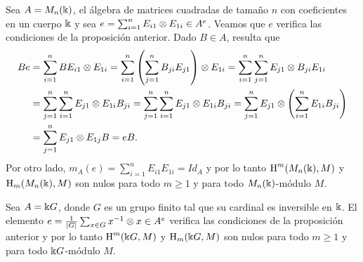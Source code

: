\documentclass[a4paper,oneside,fleqn,11pt,../tesis.tex]{subfiles}
\begin{document}
\begin{example}
	Sea $A = M_n(\Bbbk)$, el álgebra de matrices cuadradas de tamaño $n$ con coeficientes en un cuerpo $\Bbbk$ y 
	sea $e = \sum_{i = 1}^{n}E_{i1} \otimes E_{1i} \in A^e$. Veamos que $e$ verifica las condiciones de la proposición
	anterior. Dado $B \in A$, resulta que
	\begin{align*}
		Be &= \sum_{i = 1}^{n} B E_{i1} \otimes E_{1i} = \sum_{i = 1}^{n} \left(\sum_{j = 1}^{n} B_{ji} E_{j1}\right) \otimes E_{1i}
			= \sum_{i = 1}^{n} \sum_{j = 1}^{n} E_{j1}  \otimes B_{ji}  E_{1i}\\
		&= \sum_{j = 1}^{n} \sum_{i = 1}^{n} E_{j1}  \otimes   E_{1i} B_{ji} = \sum_{j = 1}^{n} \sum_{i = 1}^{n} E_{j1}  \otimes   E_{1i} B_{ji}
			= \sum_{j = 1}^{n} E_{j1}  \otimes    \left(\sum_{i = 1}^{n}E_{1i} B_{ji}\right)\\
		&= \sum_{j = 1}^{n} E_{j1} \otimes E_{1j} B = eB.
	\end{align*}
	Por otro lado, $m_A(e) = \sum_{i = 1}^{n}E_{i1} E_{1i} = Id_A$ y por lo tanto $\operatorname{H}^{m}( M_n(\Bbbk), M)$ y $\operatorname{H}_{m}( M_n(\Bbbk),M)$
	son nulos para todo $m \geq 1$ y para todo $ M_n(\Bbbk)$-módulo $M$.
\end{example}
\begin{example}
	Sea $A =\Bbbk G$, donde $G$ es un grupo finito tal que su cardinal es inversible en $\Bbbk$.
	El elemento $e = \frac{1}{|G|}\sum_{x\in G}x^{-1}\otimes x \in A^e$ verifica las condiciones de la proposición anterior
	y por lo tanto $\operatorname{H}^{m}(\Bbbk G, M)$ y $\operatorname{H}_{m}( \Bbbk G,M)$ son nulos
	para todo $m \geq 1$ y para todo $\Bbbk G$-módulo $M$.
\end{example}
\end{document}
